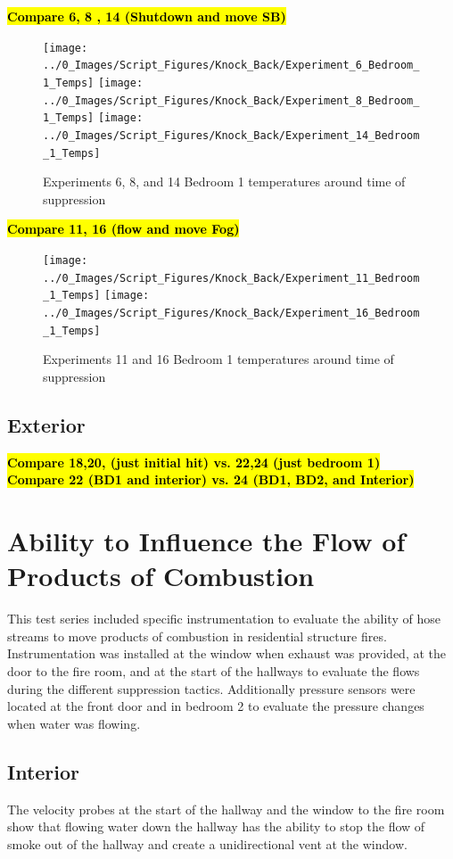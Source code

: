 \documentclass[12pt,oneside]{book}
\begin{document}
\textbf{\hl{Compare 6, 8 , 14 (Shutdown and move SB)}} \\

\begin{figure}[!ht]
	\centering
	\texttt{[image: ../0\_Images/Script\_Figures/Knock\_Back/Experiment\_6\_Bedroom\_1\_Temps]}
	\texttt{[image: ../0\_Images/Script\_Figures/Knock\_Back/Experiment\_8\_Bedroom\_1\_Temps]}
	\texttt{[image: ../0\_Images/Script\_Figures/Knock\_Back/Experiment\_14\_Bedroom\_1\_Temps]}
	\caption[]{Experiments 6, 8, and 14 Bedroom 1 temperatures around time of suppression}
	\label{fig:knockback_plots_2}
\end{figure}
\clearpage

\textbf{\hl{Compare 11, 16 (flow and move Fog)}} \\
\begin{figure}[H]
	\centering
	\texttt{[image: ../0\_Images/Script\_Figures/Knock\_Back/Experiment\_11\_Bedroom\_1\_Temps]}
	\texttt{[image: ../0\_Images/Script\_Figures/Knock\_Back/Experiment\_16\_Bedroom\_1\_Temps]}
	\caption[]{Experiments 11 and 16 Bedroom 1 temperatures around time of suppression}
	\label{fig:knockback_plots_3}
\end{figure}

\subsection{Exterior}
\textbf{\hl{Compare 18,20, (just initial hit) vs. 22,24 (just bedroom 1)}} \\
\textbf{\hl{Compare 22 (BD1 and interior) vs. 24 (BD1, BD2, and Interior)}} \\

\section{Ability to Influence the Flow of Products of Combustion}
This test series included specific instrumentation to evaluate the ability of hose streams to move products of combustion in residential structure fires. Instrumentation was installed at the window when exhaust was provided, at the door to the fire room, and at the start of the hallways to evaluate the flows during the different suppression tactics. Additionally pressure sensors were located at the front door and in bedroom 2 to evaluate the pressure changes when water was flowing. 

\subsection{Interior}
The velocity probes at the start of the hallway and the window to the fire room show that flowing water down the hallway has the ability to stop the flow of smoke out of the hallway and create a unidirectional vent at the window.
\end{document}
